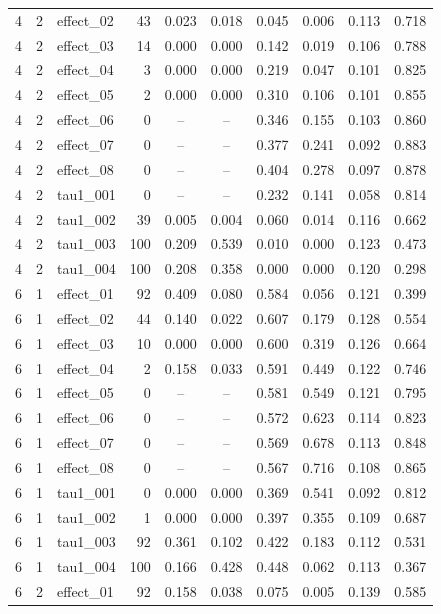 {\begin{longtable}{cc l r cc cc cc}
4 & 2 & effect\_02 & 43 & 0.023 & 0.018 & 0.045 & 0.006 & 0.113 & 0.718\\
4 & 2 & effect\_03 & 14 & 0.000 & 0.000 & 0.142 & 0.019 & 0.106 & 0.788\\
4 & 2 & effect\_04 & 3 & 0.000 & 0.000 & 0.219 & 0.047 & 0.101 & 0.825\\
4 & 2 & effect\_05 & 2 & 0.000 & 0.000 & 0.310 & 0.106 & 0.101 & 0.855\\
4 & 2 & effect\_06 & 0 & -- & -- & 0.346 & 0.155 & 0.103 & 0.860\\
4 & 2 & effect\_07 & 0 & -- & -- & 0.377 & 0.241 & 0.092 & 0.883\\
4 & 2 & effect\_08 & 0 & -- & -- & 0.404 & 0.278 & 0.097 & 0.878\\
4 & 2 & tau1\_001 & 0 & -- & -- & 0.232 & 0.141 & 0.058 & 0.814\\
4 & 2 & tau1\_002 & 39 & 0.005 & 0.004 & 0.060 & 0.014 & 0.116 & 0.662\\
4 & 2 & tau1\_003 & 100 & 0.209 & 0.539 & 0.010 & 0.000 & 0.123 & 0.473\\
4 & 2 & tau1\_004 & 100 & 0.208 & 0.358 & 0.000 & 0.000 & 0.120 & 0.298\\
\midrule
6 & 1 & effect\_01 & 92 & 0.409 & 0.080 & 0.584 & 0.056 & 0.121 & 0.399\\
6 & 1 & effect\_02 & 44 & 0.140 & 0.022 & 0.607 & 0.179 & 0.128 & 0.554\\
6 & 1 & effect\_03 & 10 & 0.000 & 0.000 & 0.600 & 0.319 & 0.126 & 0.664\\
6 & 1 & effect\_04 & 2 & 0.158 & 0.033 & 0.591 & 0.449 & 0.122 & 0.746\\
6 & 1 & effect\_05 & 0 & -- & -- & 0.581 & 0.549 & 0.121 & 0.795\\
6 & 1 & effect\_06 & 0 & -- & -- & 0.572 & 0.623 & 0.114 & 0.823\\
6 & 1 & effect\_07 & 0 & -- & -- & 0.569 & 0.678 & 0.113 & 0.848\\
6 & 1 & effect\_08 & 0 & -- & -- & 0.567 & 0.716 & 0.108 & 0.865\\
6 & 1 & tau1\_001 & 0 & 0.000 & 0.000 & 0.369 & 0.541 & 0.092 & 0.812\\
6 & 1 & tau1\_002 & 1 & 0.000 & 0.000 & 0.397 & 0.355 & 0.109 & 0.687\\
6 & 1 & tau1\_003 & 92 & 0.361 & 0.102 & 0.422 & 0.183 & 0.112 & 0.531\\
6 & 1 & tau1\_004 & 100 & 0.166 & 0.428 & 0.448 & 0.062 & 0.113 & 0.367\\
\midrule
6 & 2 & effect\_01 & 92 & 0.158 & 0.038 & 0.075 & 0.005 & 0.139 & 0.585\\

\end{longtable}}
